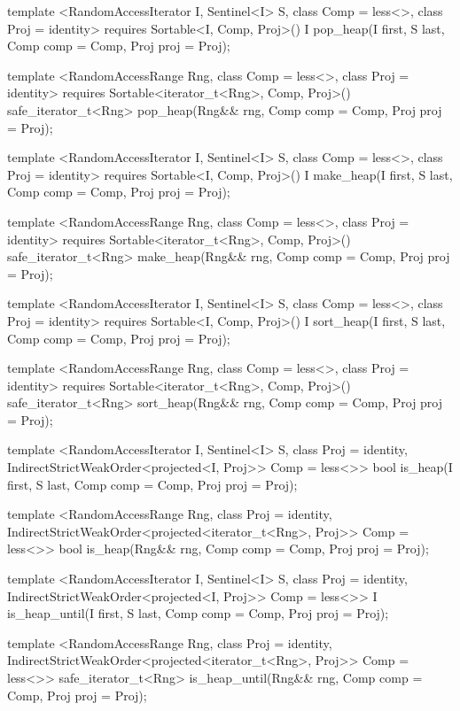\begin{codeblock}
{{{{  template <RandomAccessIterator I, Sentinel<I> S, class Comp = less<>,
      class Proj = identity>
    requires Sortable<I, Comp, Proj>()
    I pop_heap(I first, S last, Comp comp = Comp{}, Proj proj = Proj{});

  template <RandomAccessRange Rng, class Comp = less<>, class Proj = identity>
    requires Sortable<iterator_t<Rng>, Comp, Proj>()
    safe_iterator_t<Rng>
      pop_heap(Rng&& rng, Comp comp = Comp{}, Proj proj = Proj{});

  template <RandomAccessIterator I, Sentinel<I> S, class Comp = less<>,
      class Proj = identity>
    requires Sortable<I, Comp, Proj>()
    I make_heap(I first, S last, Comp comp = Comp{}, Proj proj = Proj{});

  template <RandomAccessRange Rng, class Comp = less<>, class Proj = identity>
    requires Sortable<iterator_t<Rng>, Comp, Proj>()
    safe_iterator_t<Rng>
      make_heap(Rng&& rng, Comp comp = Comp{}, Proj proj = Proj{});

  template <RandomAccessIterator I, Sentinel<I> S, class Comp = less<>,
      class Proj = identity>
    requires Sortable<I, Comp, Proj>()
    I sort_heap(I first, S last, Comp comp = Comp{}, Proj proj = Proj{});

  template <RandomAccessRange Rng, class Comp = less<>, class Proj = identity>
    requires Sortable<iterator_t<Rng>, Comp, Proj>()
    safe_iterator_t<Rng>
      sort_heap(Rng&& rng, Comp comp = Comp{}, Proj proj = Proj{});

  template <RandomAccessIterator I, Sentinel<I> S, class Proj = identity,
      IndirectStrictWeakOrder<projected<I, Proj>> Comp = less<>>
    bool is_heap(I first, S last, Comp comp = Comp{}, Proj proj = Proj{});

  template <RandomAccessRange Rng, class Proj = identity,
      IndirectStrictWeakOrder<projected<iterator_t<Rng>, Proj>> Comp = less<>>
    bool
      is_heap(Rng&& rng, Comp comp = Comp{}, Proj proj = Proj{});

  template <RandomAccessIterator I, Sentinel<I> S, class Proj = identity,
      IndirectStrictWeakOrder<projected<I, Proj>> Comp = less<>>
    I is_heap_until(I first, S last, Comp comp = Comp{}, Proj proj = Proj{});

  template <RandomAccessRange Rng, class Proj = identity,
      IndirectStrictWeakOrder<projected<iterator_t<Rng>, Proj>> Comp = less<>>
    safe_iterator_t<Rng>
      is_heap_until(Rng&& rng, Comp comp = Comp{}, Proj proj = Proj{});

}}}}
\end{codeblock}
